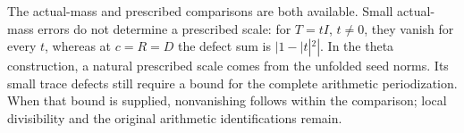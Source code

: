 The actual-mass and prescribed comparisons are both available. Small
actual-mass errors do not determine a prescribed scale: for \(T=tI\),
\(t\ne0\), they vanish for every \(t\), whereas at \(c=R=D\) the
defect sum is \(|1-|t|^2|\). In the theta construction, a natural
prescribed scale comes from the unfolded seed norms. Its small trace
defects still require a bound for the complete arithmetic periodization.
When that bound is supplied, nonvanishing follows within the comparison;
local divisibility and the original arithmetic identifications remain.
